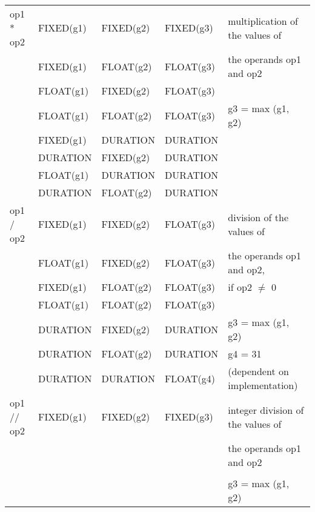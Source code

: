 \begin{table}
\begin{center}
\begin{tabular}{|l|l|l|l|l|}
op1 * op2        & FIXED(g1)       & FIXED(g2)       & FIXED(g3)         & multiplication of the values of\\
                 & FIXED(g1)       & FLOAT(g2)       & FLOAT(g3)         & the operands op1 and op2\\
                 & FLOAT(g1)       & FIXED(g2)       & FLOAT(g3)         & \\
                 & FLOAT(g1)       & FLOAT(g2)       & FLOAT(g3)         & g3 = max (g1, g2)\\
                 & FIXED(g1)       & DURATION        & DURATION          & \\
                 & DURATION        & FIXED(g2)       & DURATION          & \\
                 & FLOAT(g1)       & DURATION        & DURATION          & \\
                 & DURATION        & FLOAT(g2)       & DURATION          & \\ \hline

op1 / op2        & FIXED(g1)       & FIXED(g2)       & FLOAT(g3)         & division of the values of\\
                 & FLOAT(g1)       & FIXED(g2)       & FLOAT(g3)         & the operands op1 and op2,\\
                 & FIXED(g1)       & FLOAT(g2)       & FLOAT(g3)         & if op2 $\neq$ 0\\
                 & FLOAT(g1)       & FLOAT(g2)       & FLOAT(g3)         & \\
                 & DURATION        & FIXED(g2)       & DURATION          & g3 = max (g1, g2)\\
                 & DURATION        & FLOAT(g2)       & DURATION          & g4 = 31\\
                 & DURATION        & DURATION        & FLOAT(g4)         & (dependent on implementation)\\ \hline

op1 // op2       & FIXED(g1)       & FIXED(g2)       & FIXED(g3)         & integer division of the values of\\
                 &                 &                 &                   & the operands op1 and op2\\
                 &                 &                 &                   & \\
                 &                 &                 &                   & g3 = max (g1, g2)\\ \hline


\end{tabular}
\end{center}
\end{table}
